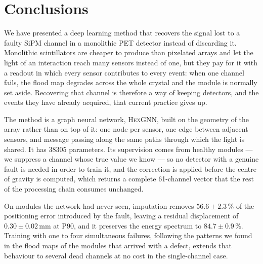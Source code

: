 \documentclass[10pt,conference]{IEEEtran}
\begin{document}
\section{Conclusions}
\label{sec:conclusions}

We have presented a deep learning method that recovers the signal lost to a
faulty SiPM channel in a monolithic PET detector instead of discarding it.
Monolithic scintillators are cheaper to produce than pixelated arrays and let
the light of an interaction reach many sensors instead of one, but they pay for
it with a readout in which every sensor contributes to
every event: when one channel fails, the flood map degrades across the whole
crystal and the module is normally set aside. Recovering that channel is
therefore a way of keeping detectors, and the events they have already
acquired, that current practice gives up.

The method is a graph neural network, \textsc{HexGNN}, built on the geometry of
the array rather than on top of it: one node per sensor, one edge between
adjacent sensors, and message passing along the same paths through which the
light is shared. It has \num{38305} parameters. Its supervision comes from
healthy modules --- we suppress a channel whose true value we know --- so no
detector with a genuine fault is needed in order to train it, and the
correction is applied before the centre of gravity is computed, which returns a
complete 61-channel vector that the rest of the processing chain consumes
unchanged.

On modules the network had never seen, imputation removes $56.6 \pm 2.3$\,\% of
the positioning error introduced by the fault, leaving a residual displacement
of $0.30 \pm 0.02$\,mm at P90, and it preserves the energy spectrum to
$84.7 \pm 0.9$\,\%. Training with one to four simultaneous failures, following
the patterns we found in the flood maps of the modules that arrived with a
defect, extends that behaviour to several dead channels at no cost in the
single-channel case.
\end{document}
